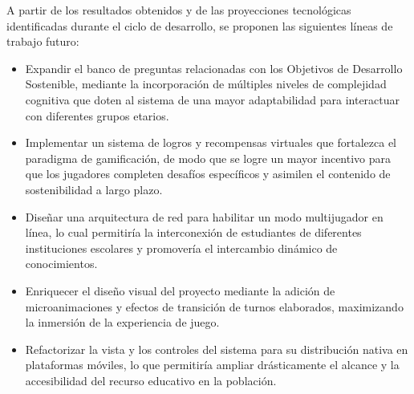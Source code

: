 \suggestions

A partir de los resultados obtenidos y de las proyecciones tecnológicas identificadas durante el ciclo de desarrollo, se proponen las siguientes líneas de trabajo futuro:

\begin{itemize}
    \item Expandir el banco de preguntas relacionadas con los Objetivos de Desarrollo Sostenible, mediante la incorporación de múltiples niveles de complejidad cognitiva que doten al sistema de una mayor adaptabilidad para interactuar con diferentes grupos etarios.
    
    \item Implementar un sistema de logros y recompensas virtuales que fortalezca el paradigma de gamificación, de modo que se logre un mayor incentivo para que los jugadores completen desafíos específicos y asimilen el contenido de sostenibilidad a largo plazo.
    
    \item Diseñar una arquitectura de red para habilitar un modo multijugador en línea, lo cual permitiría la interconexión de estudiantes de diferentes instituciones escolares y promovería el intercambio dinámico de conocimientos.
    
    \item Enriquecer el diseño visual del proyecto mediante la adición de microanimaciones y efectos de transición de turnos elaborados, maximizando la inmersión de la experiencia de juego.
    
    \item Refactorizar la vista y los controles del sistema para su distribución nativa en plataformas móviles, lo que permitiría ampliar drásticamente el alcance y la accesibilidad del recurso educativo en la población.
\end{itemize}